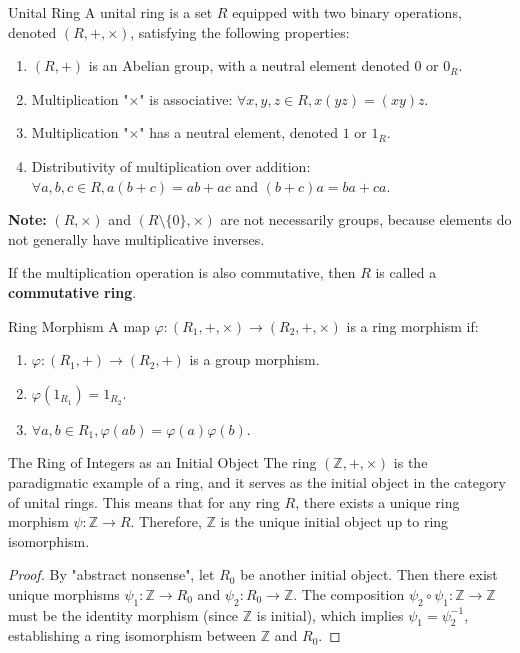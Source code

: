 \documentclass[11pt, a4paper]{article}
\newcommand{\Z}{\mathbb{Z}}
\begin{document}
\begin{definition}{Unital Ring}{}
A unital ring is a set $R$ equipped with two binary operations, denoted $(R, +, \times)$, satisfying the following properties:
\begin{enumerate}
    \item $(R, +)$ is an Abelian group, with a neutral element denoted $0$ or $0_R$. %
    \item Multiplication "$\times$" is associative: $\forall x, y, z \in R, x(yz) = (xy)z$. %
    \item Multiplication "$\times$" has a neutral element, denoted $1$ or $1_R$. %
    \item Distributivity of multiplication over addition: $\forall a, b, c \in R, a(b+c) = ab + ac$ and $(b+c)a = ba + ca$. %
\end{enumerate}
\textbf{Note:} $(R, \times)$ and $(R \setminus \{0\}, \times)$ are not necessarily groups, because elements do not generally have multiplicative inverses. %

If the multiplication operation is also commutative, then $R$ is called a \textbf{commutative ring}. %
\end{definition}

\begin{definition}{Ring Morphism}{}
A map $\varphi : (R_1, +, \times) \to (R_2, +, \times)$ is a ring morphism if:
\begin{enumerate}
    \item $\varphi : (R_1, +) \to (R_2, +)$ is a group morphism. %
    \item $\varphi(1_{R_1}) = 1_{R_2}$. %
    \item $\forall a, b \in R_1, \varphi(ab) = \varphi(a)\varphi(b)$. %
\end{enumerate}
\end{definition}

\begin{theorem}{The Ring of Integers as an Initial Object}{}
The ring $(\Z, +, \times)$ is the paradigmatic example of a ring, and it serves as the initial object in the category of unital rings. %
This means that for any ring $R$, there exists a unique ring morphism $\psi : \Z \to R$. %
Therefore, $\Z$ is the unique initial object up to ring isomorphism. %
\end{theorem}
\begin{proof}
By "abstract nonsense", let $R_0$ be another initial object. %
Then there exist unique morphisms $\psi_1 : \Z \to R_0$ and $\psi_2 : R_0 \to \Z$. %
The composition $\psi_2 \circ \psi_1 : \Z \to \Z$ must be the identity morphism (since $\Z$ is initial), which implies $\psi_1 = \psi_2^{-1}$, establishing a ring isomorphism between $\Z$ and $R_0$. %
\end{proof}
\end{document}

